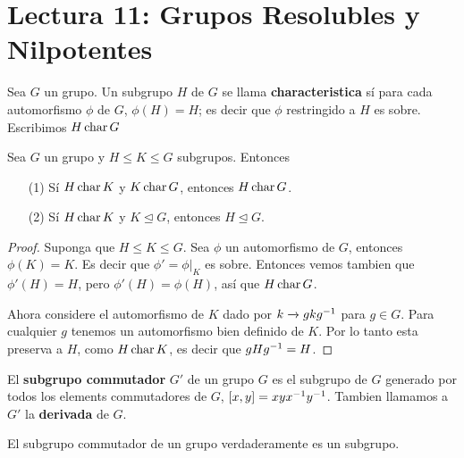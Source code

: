 \section*{Lectura 11: Grupos Resolubles y Nilpotentes}

\begin{definition}
    Sea $G$ un grupo. Un subgrupo $H$ de $G$ se llama \textbf{characteristica}
    s\'i para cada automorfismo $\phi$ de $G$, $\phi(H)=H$; es decir que $\phi$
    restringido a $H$ es sobre. Escribimos $H \operatorname{char}{G}$
\end{definition}

\begin{lemma}\label{11.46}
    Sea $G$ un grupo y  $H \leq K \leq G$ subgrupos. Entonces
    \begin{enumerate}
        \item[(1)] S\'i $H \operatorname{char}{K}$ y $K \operatorname{char}{G}$, entonces $H \operatorname{char}{G}$.

        \item[(2)] S\'i $H \operatorname{char} K$ y  $K \unlhd G$, entonces  $H \unlhd G$.
    \end{enumerate}
\end{lemma}
\begin{proof}
    Suponga que $H \leq K \leq G$. Sea  $\phi$ un automorfismo de $G$, entonces
    $\phi(K)=K$. Es decir que $\phi'=\phi|_K$ es sobre. Entonces vemos tambien
    que $\phi'(H)=H$, pero $\phi'(H)=\phi(H)$, as\'i que $H \operatorname{char}{G}$.

    Ahora considere el automorfismo de $K$ dado por  $k \xrightarrow{}
    gkg^{-1}$ para $g \in G$. Para cualquier $g$ tenemos un automorfismo bien
    definido de $K$. Por lo tanto esta preserva a  $H$, como  $H \operatorname{char}{K}$, es
    decir que $gHg^{-1}=H$.
\end{proof}

\begin{definition}
    El \textbf{subgrupo commutador} $G'$ de un grupo $G$ es el subgrupo de $G$
    generado por todos los elements commutadores de $G$,
    $[x,y]=xyx^{-1}y^{-1}$. Tambien llamamos a $G'$ la  \textbf{derivada} de
    $G$.
\end{definition}

\begin{lemma}\label{11.47}
    El subgrupo commutador de un grupo verdaderamente es un subgrupo.
\end{lemma}

